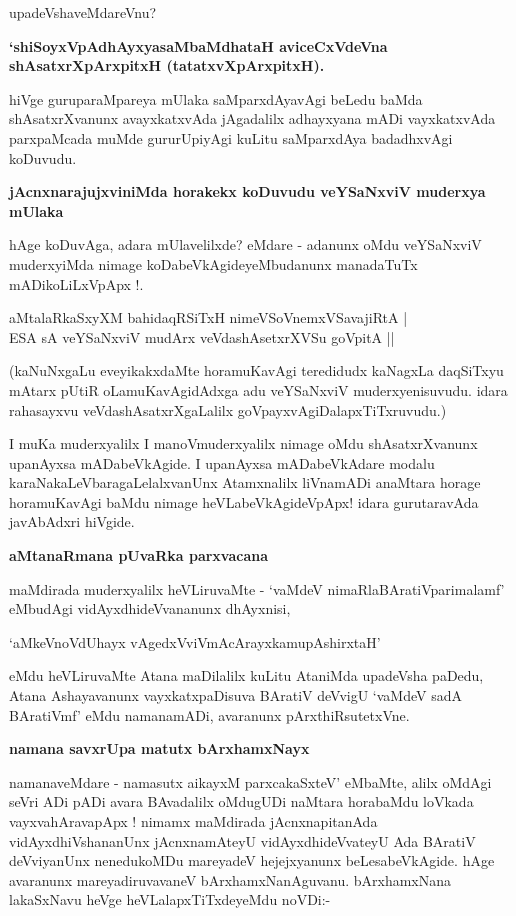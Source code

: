 \noindent
upadeVshaveMdareVnu? 

{\bf `shiSoyxVpAdhAyxyasaMbaMdhataH\label{83} aviceCxVdeVna shAsatxrXpArxpitxH (tatatxvXpArxpitxH). }

hiVge gu\-ru\-paraMpareya mUlaka saMparxdAyavAgi beLedu baMda shAsatxrXvanunx avayxkatxvAda jAgadalilx adhayxyana mADi vayxkatxvAda parxpaMcada muMde gururUpiyAgi kuLitu saMparxdAya badadhxvAgi koDuvudu.

{\bigskip
\noindent
{\large\bf jAcnxnarajujxviniMda horakekx koDuvudu veYSaNxviV muderxya mUlaka}}\label{page83}
\medskip

\noindent
hAge koDuvAga, adara mUlavelilxde? eMdare - adanunx oMdu veYSaNxviV muderxyiMda nimage koDa\-beVkAgideyeMbudanunx manadaTuTx mADikoLiLxVpApx !.

\begin{shloka}
aMtalaRkaSxyXM bahidaqRSiTxH nimeVSoVnemxVSavajiRtA |\\\label{83}
ESA sA veYSaNxviV mudArx veVdashAsetxrXVSu goVpitA ||
\end{shloka}

\noindent
(kaNuNxgaLu eveyikakxdaMte horamuKavAgi teredidudx kaNagxLa daqSiTxyu mAtarx pUtiR oLamuKavAgi\-dAdxga adu veYSaNxviV muderxyenisuvudu. idara rahasayxvu veVdashAsatxrXgaLalilx goVpayxvAgiDalapxTiTxruvudu.) 

I muKa muderxyalilx I manoVmuderxyalilx nimage oMdu shAsatxrXvanunx upanAyxsa mADabeVkAgide. I upanAyxsa mADabeVkAdare modalu karaNakaLeVbaragaLelalxvanUnx Atamxnalilx liVnamADi anaMtara horage horamuKavAgi baMdu nimage heVLabeVkAgideVpApx! idara gurutaravAda javAbAdxri hiVgide.

{\bigskip
\noindent
{\large\bf aMtanaRmana pUvaRka parxvacana}}\label{page83}
\medskip

\noindent
maMdirada muderxyalilx heVLiruvaMte - `vaMdeV nimaRlaBAratiVparimalamf' eMbudAgi vidAyxdhi\-deVva\-nanunx dhAyxnisi,

\begin{shloka}
`aMkeVnoVdUhayx vAgedxVviVmAcArayxkamupAshirxtaH'
\end{shloka}

\noindent
eMdu heVLiruvaMte Atana maDilalilx kuLitu AtaniMda upadeVsha paDedu, Atana Ashayavanunx vayxkatx\-paDi\-suva BAratiV deVvigU `vaMdeV sadA BAratiVmf' eMdu namanamADi, avaranunx pArxthiRsutetxVne.

{\bigskip
\noindent
{\large\bf namana savxrUpa matutx bArxhamxNayx}}\label{page84}
\medskip

\noindent
namanaveMdare - namasutx aikayxM parxcakaSxteV' eMbaMte, alilx oMdAgi seVri ADi pADi avara BAvadalilx oMdu\-gUDi naMtara horabaMdu loVkada vayxvahAravapApx ! nimamx maMdirada jAcnxnapitanAda vidAyxdhiVsha\-nanUnx jAcnxnamAteyU vidAyxdhideVvateyU Ada BAratiV deVviyanUnx nenedukoMDu mareyadeV hejejx\-yanunx beLesabeVkAgide. hAge avaranunx mareyadiruvavaneV bArxhamxNanAguvanu. bArxhamxNana lakaSxNavu heVge heVLalapxTiTxdeyeMdu noVDi:-


